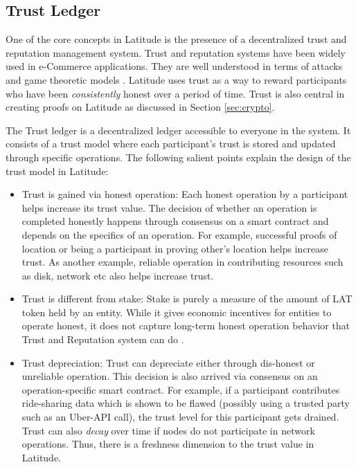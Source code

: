\subsection{Trust Ledger}
\label{sec:trust}

One of the core concepts in Latitude is the presence of a decentralized trust and reputation management system. Trust and
reputation systems have been widely used in e-Commerce applications. They are well understood in terms of attacks and
game theoretic models \cite{rahimi_2017, rahimi_2012}. Latitude uses trust as a way to reward participants who have been
{\em consistently} honest over a period of time. Trust is also central in creating proofs on Latitude as discussed in
Section \ref{sec:crypto}.

The Trust ledger is a decentralized ledger accessible to everyone in the system. It consists of a trust model where each
participant's trust is stored and updated through specific operations. The following salient points explain the design
of the trust model in Latitude:

\begin{itemize}
    \item Trust is gained via honest operation: Each honest operation by a participant helps increase its trust value.
        The decision of whether an operation is completed honestly happens through consensus on a smart contract and
        depends on the specifics of an operation. For example, successful proofs of location or being a participant in
        proving other's location helps increase trust. As another example, reliable operation in contributing resources
        such as disk, network etc also helps increase trust.
    \item Trust is different from stake: Stake is purely a measure of the amount of LAT token held by an entity. While
        it gives economic incentives for entities to operate honest, it does not capture long-term honest operation
        behavior that Trust and Reputation system can do \cite{dong_2010}.
    \item Trust depreciation: Trust can depreciate either through dis-honest or unreliable operation. This decision is
        also arrived via consensus on an operation-specific smart contract. For example, if a participant contributes
        ride-sharing data which is shown to be flawed (possibly using a trusted party such as an Uber-API call),
        the trust level for this participant gets drained. Trust can also {\em decay} over time if nodes do not
        participate in network operations. Thus, there is a freshness dimension to the trust value in Latitude.
\end{itemize}

